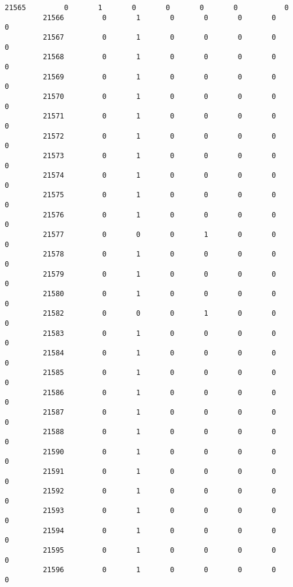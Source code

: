 \documentclass[11pt]{article}
\begin{document}
\begin{Verbatim}[commandchars=\\\{\}]
         21565         0       1       0       0       0       0           0   
         21566         0       1       0       0       0       0           0   
         21567         0       1       0       0       0       0           0   
         21568         0       1       0       0       0       0           0   
         21569         0       1       0       0       0       0           0   
         21570         0       1       0       0       0       0           0   
         21571         0       1       0       0       0       0           0   
         21572         0       1       0       0       0       0           0   
         21573         0       1       0       0       0       0           0   
         21574         0       1       0       0       0       0           0   
         21575         0       1       0       0       0       0           0   
         21576         0       1       0       0       0       0           0   
         21577         0       0       0       1       0       0           0   
         21578         0       1       0       0       0       0           0   
         21579         0       1       0       0       0       0           0   
         21580         0       1       0       0       0       0           0   
         21582         0       0       0       1       0       0           0   
         21583         0       1       0       0       0       0           0   
         21584         0       1       0       0       0       0           0   
         21585         0       1       0       0       0       0           0   
         21586         0       1       0       0       0       0           0   
         21587         0       1       0       0       0       0           0   
         21588         0       1       0       0       0       0           0   
         21590         0       1       0       0       0       0           0   
         21591         0       1       0       0       0       0           0   
         21592         0       1       0       0       0       0           0   
         21593         0       1       0       0       0       0           0   
         21594         0       1       0       0       0       0           0   
         21595         0       1       0       0       0       0           0   
         21596         0       1       0       0       0       0           0   
         

\end{Verbatim}
\end{document}
